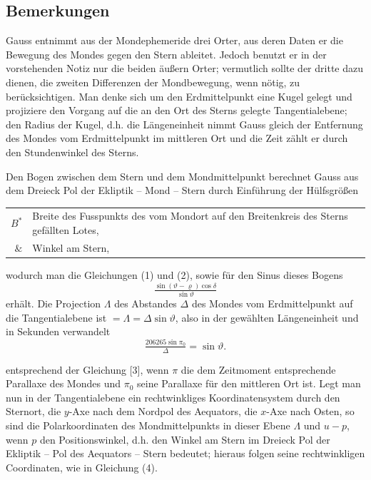 \documentclass[12pt,a4paper]{article}
\theoremstyle{plain}
\theoremstyle{definition}
\theoremstyle{remark}
\begin{document}
\subsection*{Bemerkungen}

Gauss entnimmt aus der Mondephemeride drei Orter, aus deren Daten er die Bewegung des Mondes gegen den Stern ableitet. Jedoch benutzt er in der vorstehenden Notiz nur die beiden \"au\ss ern Orter; vermutlich sollte der dritte dazu dienen, die zweiten Differenzen der Mondbewegung, wenn n\"otig, zu ber\"ucksichtigen. Man denke sich um den Erdmittelpunkt eine Kugel gelegt und projiziere den Vorgang auf die an den Ort des Sterns gelegte Tangentialebene; den Radius der Kugel, d.h. die L\"angeneinheit nimmt Gauss gleich der Entfernung des Mondes vom Erdmittelpunkt im mittleren Ort und die Zeit z\"ahlt er durch den Stundenwinkel des Sterns.

Den Bogen zwischen dem Stern und dem Mondmittelpunkt berechnet Gauss aus dem Dreieck \glqq Pol der Ekliptik -- Mond -- Stern\grqq{} durch Einf\"uhrung der H\"ulfsgr\"o\ss en
\begin{center}
\begin{tabular}{r@{\ldots\ }l}
$B^*$ & Breite des Fusspunkts des vom Mondort auf den Breitenkreis des Sterns gef\"allten Lotes, \\
$\&$ & Winkel am Stern,
\end{tabular}
\end{center}
wodurch man die Gleichungen (1) und (2), sowie f\"ur den Sinus dieses Bogens
\[
\tfrac{\sin(\vartheta - \varrho) \cos\delta}{\sin\vartheta}
\]
erh\"alt. Die Projection $\Lambda$ des Abstandes $\Delta$ des Mondes vom Erdmittelpunkt auf die Tangentialebene ist $= \Lambda = \Delta \sin\vartheta$, also in der gew\"ahlten L\"angeneinheit und in Sekunden verwandelt
\[
\tfrac{206265 \sin\pi_0}{\Delta} = \sin\vartheta.
\]

entsprechend der Gleichung [3], wenn $\pi$ die dem Zeitmoment entsprechende Parallaxe des Mondes und $\pi_0$ seine Parallaxe f\"ur den mittleren Ort ist. Legt man nun in der Tangentialebene ein rechtwinkliges Koordinatensystem durch den Sternort, die $y$-Axe nach dem Nordpol des Aequators, die $x$-Axe nach Osten, so sind die Polarkoordinaten des Mondmittelpunkts in dieser Ebene $\Lambda$ und $u - p$, wenn $p$ den \glqq Positionswinkel\grqq, d.h. den Winkel am Stern im Dreieck \glqq Pol der Ekliptik -- Pol des Aequators -- Stern\grqq{} bedeutet; hieraus folgen seine rechtwinkligen Coordinaten, wie in Gleichung (4).
\end{document}
